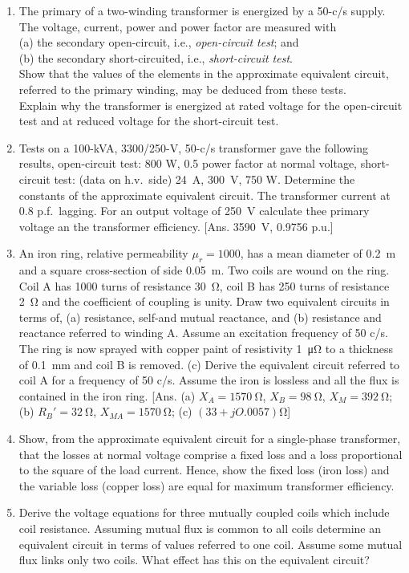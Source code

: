 \documentclass[a4paper,numbers=noenddot,12pt]{scrbook}
\begin{document}
\begin{enumerate}[label={\thechapter.\arabic*},leftmargin=*]
\item The primary of a two-winding transformer is energized by a 50-c/s supply. The voltage, current, power and power factor are measured with \\
(a) the secondary open-circuit, i.e., \textit{open-circuit test}; and \\
(b) the secondary short-circuited, i.e., \textit{short-circuit test}. \\
Show that the values of the elements in the approximate equivalent circuit, referred to the primary winding, may be deduced from these tests. \\
Explain why the transformer is energized at rated voltage for the open-circuit test and at reduced voltage for the short-circuit test.


\item Tests on a 100-kVA, 3300/250-V, 50-c/s transformer gave the following results, 
open-circuit test: 800 W, 0.5 power factor at normal voltage, 
short-circuit test: (data on h.v.\ side) \SI{24}{\ampere}, \SI{300}{\volt}, 750 W. 
Determine the constants of the approximate equivalent circuit. The transformer current at 0.8 p.f.\ lagging. For an output voltage of \SI{250}{\volt} calculate thee primary voltage an the transformer efficiency.
[Ans. \SI{3590}{\volt}, 0.9756 p.u.]

\item An iron ring, relative permeability $\mu_r = 1000$, has a mean diameter of \SI{0.2}{\meter} and a square cross-section of side \SI{0.05}{\meter}.
Two coils are wound on the ring. Coil A has 1000 turns of resistance \SI{30}{\ohm}, coil B has 250 turns of resistance \SI{2}{\ohm} and the coefficient of coupling is unity. 
Draw two equivalent circuits in terms of, 
(a) resistance, self-and mutual reactance, and
(b) resistance and reactance referred to winding A. 
Assume an excitation frequency of 50 c/s. 
The ring is now sprayed with copper paint of resistivity \SI{1}{\micro\ohm} to a thickness of \SI{0.1}{\milli\metre} and coil B is removed.
(c) Derive the equivalent circuit referred to coil A for a frequency of 50 c/s.
Assume the iron is lossless and all the flux is contained in the iron ring.
[Ans. (a) $X_A = \SI{1570}{\ohm}$, $X_B = \SI{98}{\ohm}$, $X_M = \SI{392}{\ohm}$; (b) $R_B' = \SI{32}{\ohm}$, $X_{MA} = \SI{1570}{\ohm}$; (c) $(33 + jO.0057)\si{\ohm}$] 

\item Show, from the approximate equivalent circuit for a single-phase transformer, that the losses at normal voltage comprise a fixed loss and a loss proportional to the square of the load current. 
Hence, show the fixed loss (iron loss) and the variable loss (copper loss) are equal for maximum transformer efficiency.

\item Derive the voltage equations for three mutually coupled coils which include coil resistance.
Assuming mutual flux is common to all coils determine an equivalent circuit in terms of values referred to one coil. 
Assume some mutual flux links only two coils. What effect has this on the equivalent circuit?
\end{enumerate}
\endgroup
\end{document}
